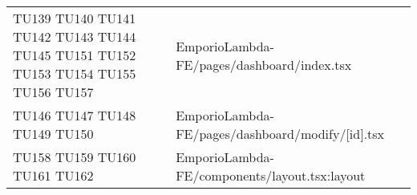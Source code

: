 {\begin{longtable}{C{2cm} C{12.8cm}}
TU139 \newline TU140 \newline TU141 \newline TU142 \newline TU143 \newline TU144 \newline TU145 \newline TU151 \newline TU152 \newline TU153 \newline TU154 \newline TU155 \newline TU156 \newline TU157 & EmporioLambda-FE/pages/dashboard/index.tsx\\

TU146 \newline TU147 \newline TU148 \newline TU149 \newline TU150 & EmporioLambda-FE/pages/dashboard/modify/[id].tsx\\



TU158 \newline TU159 \newline TU160 \newline TU161 \newline TU162 & EmporioLambda-FE/components/layout.tsx:layout





\end{longtable}

}

